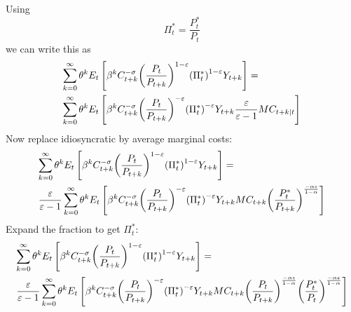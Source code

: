 \documentclass[12pt,a4paper]{article}
\begin{document}
Using \begin{equation}
{\Pi _t^*}={\frac{{P_t^*}}{{{P_t}}}}
\end{equation}
we can write this as
\begin{equation}\begin{gathered}
  \sum\limits_{k = 0}^\infty  {{\theta ^k}{E_t}\left[ {{\beta ^k}C_{t + k}^{ - \sigma }{{\left( {\frac{{{P_t}}}{{{P_{t + k}}}}} \right)}^{1 - \varepsilon }}{{\left( {\Pi _t^*} \right)}^{1 - \varepsilon }}{Y_{t + k}}} \right]}  =  \hfill \\
  \sum\limits_{k = 0}^\infty  {{\theta ^k}{E_t}\left[ {{\beta ^k}C_{t + k}^{ - \sigma }{{\left( {\frac{{{P_t}}}{{{P_{t + k}}}}} \right)}^{ - \varepsilon }}{{\left( {\Pi _t^*} \right)}^{ - \varepsilon }}{Y_{t + k}}\frac{\varepsilon }{{\varepsilon  - 1}}M{C_{t + k|t}}} \right]}  \hfill \\
\end{gathered} \end{equation}
Now replace idiosyncratic by average marginal costs:
\begin{equation}\begin{gathered}
  \sum\limits_{k = 0}^\infty  {{\theta ^k}{E_t}\left[ {{\beta ^k}C_{t + k}^{ - \sigma }{{\left( {\frac{{{P_t}}}{{{P_{t + k}}}}} \right)}^{1 - \varepsilon }}{{\left( {\Pi _t^*} \right)}^{1 - \varepsilon }}{Y_{t + k}}} \right]}  =  \hfill \\
  \frac{\varepsilon }{{\varepsilon  - 1}}\sum\limits_{k = 0}^\infty  {{\theta ^k}{E_t}\left[ {\beta ^k}C_{t + k}^{ - \sigma }{{\left( {\frac{{{P_t}}}{{{P_{t + k}}}}} \right)}^{ - \varepsilon }}{{\left( {\Pi _t^*} \right)}^{ - \varepsilon }}{Y_{t + k}}M{C_{t + k}}{{{\left( {\frac{{P_t^*}}{{{P_{t + k}}}}} \right)}^{\frac{{ - \alpha \varepsilon }}{{1 - \alpha }}}}} \right]}  \hfill \\
\end{gathered} \end{equation}
Expand the fraction to get $\Pi_t^*$:
\begin{equation}\begin{gathered}
  \sum\limits_{k = 0}^\infty  {{\theta ^k}{E_t}\left[ {{\beta ^k}C_{t + k}^{ - \sigma }{{\left( {\frac{{{P_t}}}{{{P_{t + k}}}}} \right)}^{1 - \varepsilon }}{{\left( {\Pi _t^*} \right)}^{1 - \varepsilon }}{Y_{t + k}}} \right]}  =  \hfill \\
  \frac{\varepsilon }{{\varepsilon  - 1}}\sum\limits_{k = 0}^\infty  {{\theta ^k}{E_t}\left[ {\beta ^k}C_{t + k}^{ - \sigma }{{\left( {\frac{{{P_t}}}{{{P_{t + k}}}}} \right)}^{ - \varepsilon }}{{\left( {\Pi _t^*} \right)}^{ - \varepsilon }}{Y_{t + k}}M{C_{t + k}}{{{\left( {\frac{{{P_t}}}{{{P_{t + k}}}}} \right)}^{\frac{{ - \alpha \varepsilon }}{{1 - \alpha }}}}{{\left( {\frac{{P_t^*}}{{{P_t}}}} \right)}^{\frac{{ - \alpha \varepsilon }}{{1 - \alpha }}}}} \right]}  \hfill \\
\end{gathered} \end{equation}
\end{document}
